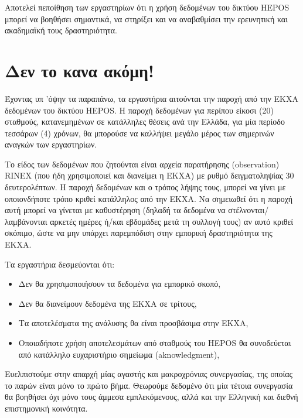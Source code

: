 \documentclass[11pt]{article}
\begin{document}
Αποτελεί πεποίθηση των εργαστηρίων ότι η χρήση δεδομένων του δικτύου HEPOS μπορεί να βοηθήσει σημαντικά, να στηρίξει και να αναβαθμίσει την ερευνητική και ακαδημαϊκή τους δραστηριότητα.

\section{Δεν το κανα ακόμη!}
Έχοντας υπ 'όψην τα παραπάνω, τα εργαστήρια αιτούνται την παροχή από την ΕΚΧΑ δεδομένων του δικτύου HEPOS. Η παροχή δεδομένων για περίπου είκοσι (20) σταθμούς, κατανεμημένων σε κατάλληλες θέσεις ανά την Ελλάδα, για μία περίοδο τεσσάρων (4) χρόνων, θα μπορούσε να καλλήψει μεγάλο μέρος των σημερινών αναγκών των εργαστηρίων.

Το είδος των δεδομένων που ζητούνται είναι αρχεία παρατήρησης (observation) RINEX (που ήδη χρησιμοποιεί και διανείμει η ΕΚΧΑ) με ρυθμό δειγματοληψίας 30 δευτερολέπτων. Η παροχή δεδομένων και ο τρόπος λήψης τους, μπορεί να γίνει με οποιονδήποτε τρόπο κριθεί κατάλληλος από την ΕΚΧΑ. Να σημειωθεί ότι η παροχή αυτή μπορεί να γίνεται με καθυστέρηση (δηλαδή τα δεδομένα να στέλνονται/λαμβάνονται αρκετές ημέρες ή/και εβδομάδες μετά τη συλλογή τους) αν αυτό κριθεί σκόπιμο, ώστε να μην υπάρχει παρεμπόδιση στην εμπορική δραστηριότητα της ΕΚΧΑ.

Τα εργαστήρια δεσμεύονται ότι:
\begin{itemize}
\item Δεν θα χρησιμοποιήσουν τα δεδομένα για εμπορικό σκοπό,
\item Δεν θα διανείμουν δεδομένα της ΕΚΧΑ σε τρίτους,
\item Τα αποτελέσματα της ανάλυσης θα είναι προσβάσιμα στην ΕΚΧΑ,
\item Οποιαδήποτε χρήση αποτελεσμάτων από σταθμούς του HEPOS θα συνοδεύεται από κατάλληλο ευχαριστήριο σημείωμα (aknowledgment),
\end{itemize}

Ευελπιστούμε στην απαρχή μίας αγαστής και μακροχρόνιας συνεργασίας, της οποίας το παρών είναι μόνο το πρώτο βήμα. Θεωρούμε δεδομένο ότι μία τέτοια συνεργασία θα βοηθήσει όχι μόνο τους άμμεσα εμπλεκόμενους, αλλά και την Ελληνική και διεθνή επιστημονική κοινότητα.




\end{document}
